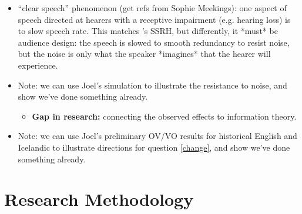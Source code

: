 \documentclass[11pt]{article}
\begin{document}
\begin{itemize}
	\item ``clear speech'' phenomenon (get refs from Sophie Meekings): one aspect of speech directed at hearers with a receptive impairment (e.g. hearing loss) is to slow speech rate. This matches \citet{aylettturk2004}'s SSRH, but differently, it *must* be audience design: the speech is slowed to smooth redundancy to resist noise, but the noise is only what the speaker *imagines* that the hearer will experience.
	\item Note: we can use Joel's simulation to illustrate the resistance to noise, and show we've done something already. 
	\begin{itemize}
		\item \textbf{Gap in research:} connecting the observed effects to information theory.
	\end{itemize}
	\item Note: we can use Joel's preliminary OV/VO results for historical English and Icelandic to illustrate directions for question \ref{change}, and show we've done something already.
\end{itemize}


\section{Research Methodology}
\end{document}
